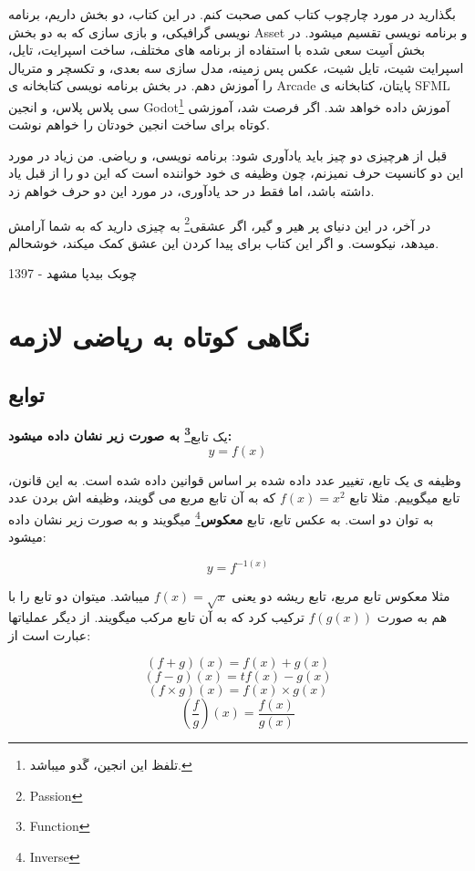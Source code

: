 \documentclass[14pt,a4paper]{memoir}
\begin{document}
	بگذارید در مورد چارچوب کتاب کمی صحبت کنم. در این کتاب، دو بخش داریم، برنامه نویسی گرافیکی، و بازی سازی که به دو بخش Asset و برنامه نویسی تقسیم میشود. در بخش اَسِت سعی شده با استفاده از برنامه های مختلف، ساخت اسپرایت، تایل، اسپرایت شیت، تایل شیت، عکس پس زمینه، مدل سازی سه بعدی، و تکسچر و متریال  را آموزش دهم. در بخش برنامه نویسی کتابخانه ی Arcade پایتان، کتابخانه ی SFML سی پلاس پلاس، و انجین Godot\footnote{تلفظ این انجین، گَدو میباشد.} آموزش داده خواهد شد. اگر فرصت شد، آموزشی کوتاه برای ساخت انجین خودتان را خواهم نوشت.
	
	قبل از هرچیزی دو چیز باید یادآوری شود: برنامه نویسی، و ریاضی. من زیاد در مورد این دو کانسپت حرف نمیزنم، چون وظیفه ی خود خواننده است که این دو را از قبل یاد داشته باشد، اما فقط در حد یادآوری، در مورد این دو حرف خواهم زد.
	 
		 در آخر، در این دنیای پر هیر و گیر، اگر عشقی\footnote{Passion} به چیزی دارید که به شما آرامش میدهد، نیکوست. و اگر این کتاب برای پیدا کردن این عشق کمک میکند، خوشحالم.
	 
	 \begin{flushleft}
	 	چوبک بیدپا
	 	مشهد - 1397
	 \end{flushleft}
	 
	 
	 
	 \chapter{نگاهی کوتاه به ریاضی لازمه}\label{math}
	 \section{توابع}\label{functions}

یک تابع\textbf{\footnote{Function} به صورت زیر نشان داده میشود:
\[y = f(x)\]}

وظیفه ی یک تابع، تغییر عدد داده شده بر اساس قوانین داده شده است. به این قانون، تابع میگوییم. مثلا تابع \(f(x) = x^2\) که به آن تابع مربع می گویند، وظیفه اش بردن عدد به توان دو است. به عکس تابع، تابع \textbf{معکوس}\footnote{Inverse} میگویند و به صورت زیر نشان داده میشود:

\[y = f^{-1(x)}\]

مثلا معکوس تابع مربع، تابع ریشه دو یعنی $ f(x) = \sqrt{x} $ میباشد. میتوان دو تابع را با هم به صورت $ f(g(x)) $ ترکیب کرد که به آن تابع مرکب میگویند. از دیگر عملیاتها عبارت است از:

\[  (f + g)(x) = f(x) + g(x) \]
\[ (f - g)(x) = t f(x) - g(x) \]
\[  (f \times g)(x) =  f(x) \times g(x) \]
\[  \left(\frac{f}{g}\right)(x) =  \frac{f(x)}{g(x)} \]
\end{document}

